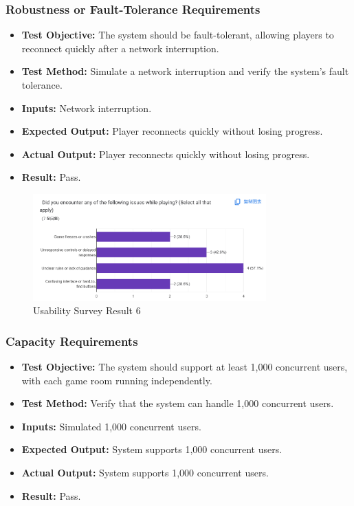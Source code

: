 \documentclass[12pt, titlepage]{article}
\begin{document}
\subsubsection{Robustness or Fault-Tolerance Requirements}
\begin{itemize}
    \item \textbf{Test Objective:} The system should be fault-tolerant, allowing players to reconnect quickly after a network interruption.
    \item \textbf{Test Method:} Simulate a network interruption and verify the system's fault tolerance.
    \item \textbf{Inputs:} Network interruption.
    \item \textbf{Expected Output:} Player reconnects quickly without losing progress.
    \item \textbf{Actual Output:} Player reconnects quickly without losing progress.
    \item \textbf{Result:} Pass.
\end{itemize}
\begin{figure}[h!]
    \centering
    \includegraphics[width=0.8\textwidth]{image5.png}
    \caption{Usability Survey Result 6}
    \label{fig:labelname}
\end{figure}

\subsubsection{Capacity Requirements}
\begin{itemize}
    \item \textbf{Test Objective:} The system should support at least 1,000 concurrent users, with each game room running independently.
    \item \textbf{Test Method:} Verify that the system can handle 1,000 concurrent users.
    \item \textbf{Inputs:} Simulated 1,000 concurrent users.
    \item \textbf{Expected Output:} System supports 1,000 concurrent users.
    \item \textbf{Actual Output:} System supports 1,000 concurrent users.
    \item \textbf{Result:} Pass.
\end{itemize}
\end{document}
